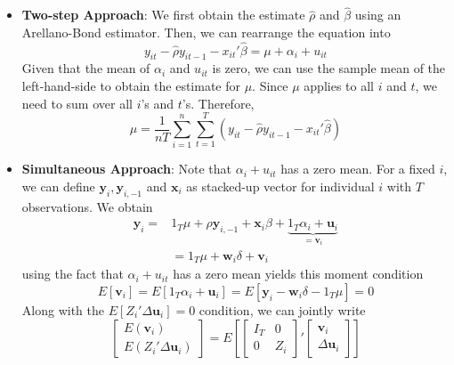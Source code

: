 \begin{itemize}
\item \textbf{Two-step Approach}: We first obtain the estimate $\hat{\rho}$ and $\hat{\beta}$ using an Arellano-Bond estimator. Then, we can rearrange the equation into
\[
y_{it}-\hat{\rho} y_{it-1}-x_{it}'\hat{\beta}=\mu+\alpha_i + u_{it}
\]
Given that the mean of $\alpha_i$ and $u_{it}$ is zero, we can use the sample mean of the left-hand-side to obtain the estimate for $\mu$. Since $\mu$ applies to all $i$ and $t$, we need to sum over all $i$'s and $t$'s. Therefore, 
\[
\hat{\mu}=\frac{1}{nT}\sum_{i=1}^n \sum_{t=1}^T\left(y_{it}-\hat{\rho} y_{it-1}-x_{it}'\hat{\beta}\right)
\]
\item \textbf{Simultaneous Approach}: Note that $\alpha_i + u_{it}$ has a zero mean. For a fixed $i$, we can define $\mathbf{y}_i, \mathbf{y}_{i,-1}$ and $\mathbf{x}_i$ as stacked-up vector for individual $i$ with $T$ observations. We obtain
\small{\begin{align*}
\mathbf{y}_i =& 1_T\mu+\rho\mathbf{y}_{i,-1}+\mathbf{x}_i\beta+\underbrace{1_T\alpha_i + \mathbf{u}_i}_{=\mathbf{v}_i}\\
&=1_T\mu+\mathbf{w}_i\delta+\mathbf{v}_i
\end{align*}}\normalsize
using the fact that $\alpha_i + u_{it}$ has a zero mean yields this moment condition
\[
E[\mathbf{v}_i]=E[1_T\alpha_i + \mathbf{u}_i]=E[\mathbf{y}_i-\mathbf{w}_i\delta-1_T\mu]=0
\]
Along with the $E[Z_i'\Delta \mathbf{u}_i]=0$ condition, we can jointly write
\[
\begin{bmatrix}E(\mathbf{v}_i) \\ E(Z_i'\Delta \mathbf{u}_i) \end{bmatrix}=E\left[\begin{bmatrix}I_T & 0 \\ 0 & Z_i\end{bmatrix}'\begin{bmatrix}\mathbf{v}_i \\ \Delta\mathbf{u}_i \end{bmatrix}\right]
\]
\end{itemize}
